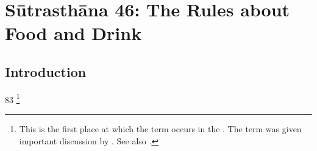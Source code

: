 

\chapter{Sūtrasthāna 46: The Rules about Food and Drink}

\section{Introduction}

\begin{translation}
    \item \item[83] \label{dusivisa}%
    \footnote{This is the first place at which the term 
         occurs in the \SS. 
         The term  was given important discussion
         by \cite{meul-1992,meul-1991,meul-2011}.  See also 
         \cite[548--550]{das-2003}.}
    \end{translation}